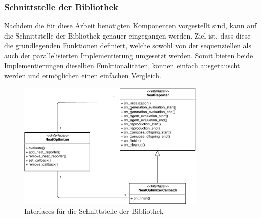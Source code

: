 \subsubsection{Schnittstelle der Bibliothek}
\label{subsubsec:library_interface}
Nachdem die für diese Arbeit benötigten Komponenten vorgestellt sind, kann auf die Schnittstelle der Bibliothek genauer eingegangen werden. Ziel ist, dass diese die grundlegenden Funktionen definiert, welche sowohl von der sequenziellen als auch der parallelisierten Implementierung umgesetzt werden. Somit bieten beide Implementierungen dieselben Funktionalitäten, können einfach ausgetauscht werden und ermöglichen einen einfachen Vergleich. 
\begin{figure}[!h]
	\centering
	\includegraphics[width=0.8\textwidth]{./img/uml/uml-library_interface.pdf} 
	\caption{Interfaces für die Schnittstelle der Bibliothek}
	\label{fig:library_interface}
\end{figure}
\\ \noindent
